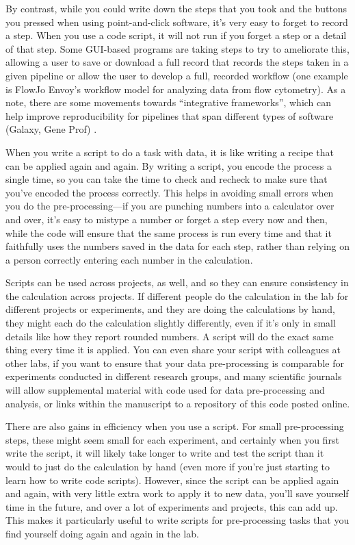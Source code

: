 \documentclass[]{tufte-book}
\begin{document}
By contrast, while you could write down the steps that you took and the buttons
you pressed when using point-and-click software, it's very easy to forget to
record a step. When you use a code script, it will not run if you forget a step
or a detail of that step. Some GUI-based programs are taking steps to try to
ameliorate this, allowing a user to save or download a full record that records
the steps taken in a given pipeline or allow the user to develop a full,
recorded workflow (one example is FlowJo Envoy's workflow model for analyzing
data from flow cytometry). As a note, there are some movements towards
``integrative frameworks'', which can help improve reproducibility for pipelines
that span different types of software (Galaxy, Gene Prof) \citep{nekrutenko2012next}.

When you write a script to do a task with data, it is like writing a recipe that
can be applied again and again. By writing a script, you encode the process a
single time, so you can take the time to check and recheck to make sure that
you've encoded the process correctly. This helps in avoiding small errors when
you do the pre-processing---if you are punching numbers into a calculator over
and over, it's easy to mistype a number or forget a step every now and then,
while the code will ensure that the same process is run every time and that it
faithfully uses the numbers saved in the data for each step, rather than relying
on a person correctly entering each number in the calculation.

Scripts can be used across projects, as well, and so they can ensure consistency
in the calculation across projects. If different people do the calculation in
the lab for different projects or experiments, and they are doing the
calculations by hand, they might each do the calculation slightly differently,
even if it's only in small details like how they report rounded numbers. A
script will do the exact same thing every time it is applied. You can even share
your script with colleagues at other labs, if you want to ensure that your data
pre-processing is comparable for experiments conducted in different research
groups, and many scientific journals will allow supplemental material with
code used for data pre-processing and analysis, or links within the manuscript
to a repository of this code posted online.

There are also gains in efficiency when you use a script. For small
pre-processing steps, these might seem small for each experiment, and certainly
when you first write the script, it will likely take longer to write and test
the script than it would to just do the calculation by hand (even more if
you're just starting to learn how to write code scripts). However, since the
script can be applied again and again, with very little extra work to apply it
to new data, you'll save yourself time in the future, and over a lot of
experiments and projects, this can add up. This makes it particularly useful to
write scripts for pre-processing tasks that you find yourself doing again and
again in the lab.
\end{document}
